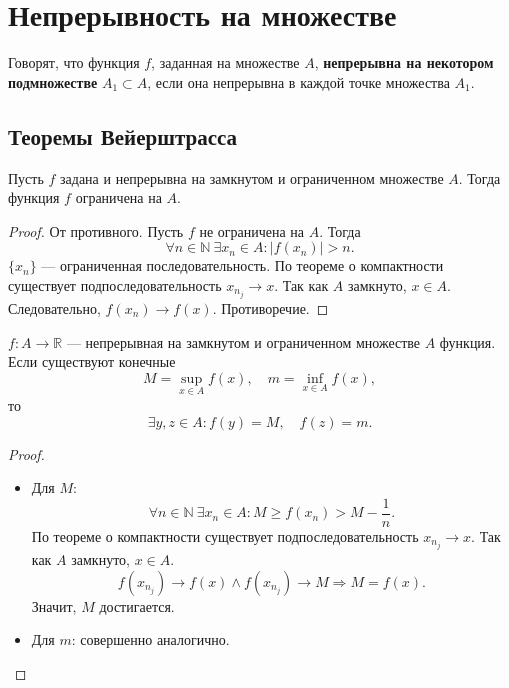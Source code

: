 \documentclass[11pt]{book}
\newcommand{\N}{\mathbb{N}}
\newcommand{\R}{\mathbb{R}}
\renewcommand{\ge}{\geqslant}
\theoremstyle{definition}
\theoremstyle{plain}
\theoremstyle{plain}
\theoremstyle{definition}
\theoremstyle{remark}
\begin{document}
\section{Непрерывность на множестве}
\begin{defn}
    Говорят, что функция $ f$, заданная на множестве $ A$,  {\bf непрерывна на некотором подмножестве} $ A_1 \subset A$, если она непрерывна в каждой точке множества $ A_1$.
\end{defn}
\subsection{Теоремы Вейерштрасса}\label{th_ve_1}
\begin{thm}
    Пусть $ f$ задана и непрерывна на замкнутом и ограниченном множестве  $ A$. Тогда функция  $ f$ ограничена на  $ A$.
\end{thm}
\begin{proof}
    От противного. Пусть $ f$ не ограничена на $ A$. Тогда
    \[
	\forall n \in \N ~ \exists x_{n} \in A: |f(x_{n})|>n
    .\]
    $ \{x_{n}\}$ --- ограниченная последовательность. По теореме о компактности существует подпоследовательность $ x_{n_{j}} \to x$. Так как $ A$ замкнуто, $ x \in A$. Следовательно, $ f(x_{n}) \to  f(x)$. Противоречие.
\end{proof}
\begin{thm}\label{th_ve_2}
    $ f: A \to \R$ --- непрерывная на замкнутом и ограниченном множестве $ A$ функция. Если существуют конечные
    $$
    M = \sup_{x \in A}f(x), \quad m = \inf_{x \in A} f(x)
    ,
    $$
    то \[
	\exists y, z \in A: f(y) = M, \quad f(z) = m
    .\]
\end{thm}
\begin{proof}
    $ $
    \begin{itemize}
	\item Для $ M$:
	    \[
		\forall n \in \N ~ \exists x_{n} \in A: M \ge f(x_{n}) > M -\frac{1}{n}
	    .\]
	    По теореме о компактности существует подпоследовательность $ x_{n_{j}} \to x$. Так как $ A$ замкнуто, $ x \in A$.
	    \[
		f(x_{n_j}) \to  f(x) \wedge f(x_{n_{j}}) \to  M \Longrightarrow M = f(x)
	    .\]
	    Значит, $ M$ достигается.
	\item Для $ m$: совершенно аналогично.
    \end{itemize}
\end{proof}
\end{document}
